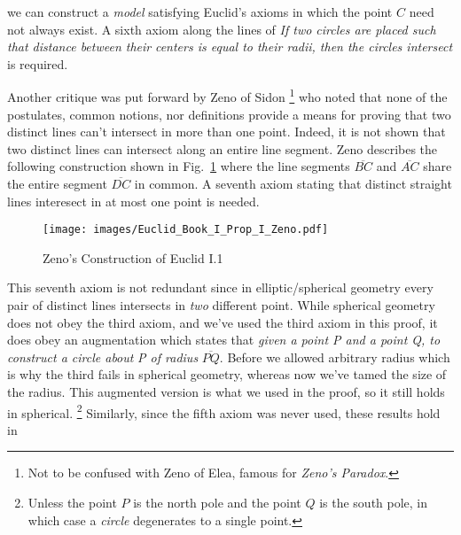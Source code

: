         we can construct a \textit{model} satisfying Euclid's axioms in which
        the point $C$ need not always exist. A sixth axiom along the lines of
        \textit{If two circles are placed such that distance between their}
        \textit{centers is equal to their radii, then the circles intersect} is
        required.
        \par\hfill\par
        Another critique was put forward by Zeno of Sidon%
        \footnote{%
            Not to be confused with Zeno of Elea, famous for
            \textit{Zeno's Paradox}.
        }
        who noted that none of the postulates, common notions, nor definitions
        provide a means for proving that two distinct lines can't intersect in
        more than one point. Indeed, it is not shown that two distinct lines can
        intersect along an entire line segment. Zeno describes the following
        construction shown in Fig.~\ref{fig:Zeno_Euclid_I_1} where the line
        segments $\overline{BC}$ and $\overline{AC}$ share the entire segment
        $\overline{DC}$ in common. A seventh axiom stating that distinct
        straight lines interesect in at most one point is needed.%
        \begin{figure}[H]
            \centering
            \captionsetup{type=figure}
            \texttt{[image: images/Euclid\_Book\_I\_Prop\_I\_Zeno.pdf]}
            \caption{Zeno's Construction of Euclid I.1}
            \label{fig:Zeno_Euclid_I_1}
        \end{figure}
        This seventh axiom is not redundant since in elliptic/spherical geometry
        every pair of distinct lines intersects in \textit{two} different point.
        While spherical geometry does not obey the third axiom, and we've used
        the third axiom in this proof, it does obey an augmentation which states
        that \textit{given a point P and a point Q, to construct a circle about}
        \textit{P of radius} $\overline{PQ}$. Before we allowed arbitrary radius
        which is why the third fails in spherical geometry, whereas now we've
        tamed the size of the radius. This augmented version is what we used in
        the proof, so it still holds in spherical.%
        \footnote{%
            Unless the point $P$ is the north pole and the point $Q$ is the
            south pole, in which case a \textit{circle} degenerates to a single
            point.
        }
        Similarly, since the fifth axiom was never used, these results hold in
